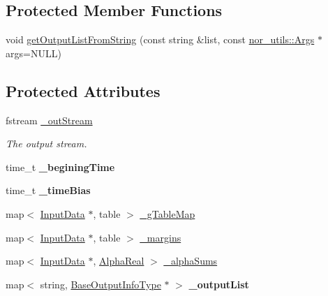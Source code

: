 \subsection*{Protected Member Functions}
\begin{DoxyCompactItemize}
\item 
void \hyperlink{classMultiBoost_1_1OutputInfo_a0c6dfc8babe3815d10888d2ec7c6ccc9}{get\-Output\-List\-From\-String} (const string \&list, const \hyperlink{classnor__utils_1_1Args}{nor\-\_\-utils\-::\-Args} $\ast$args=N\-U\-L\-L)
\end{DoxyCompactItemize}
\subsection*{Protected Attributes}
\begin{DoxyCompactItemize}
\item 
\hypertarget{classMultiBoost_1_1OutputInfo_a9218ec74c3b278be4ad81d90a93d5535}{fstream \hyperlink{classMultiBoost_1_1OutputInfo_a9218ec74c3b278be4ad81d90a93d5535}{\-\_\-out\-Stream}}\label{classMultiBoost_1_1OutputInfo_a9218ec74c3b278be4ad81d90a93d5535}

\begin{DoxyCompactList}\small\item\em The output stream. \end{DoxyCompactList}\item 
\hypertarget{classMultiBoost_1_1OutputInfo_a412abadc6b0171bf233890c00965e62a}{time\-\_\-t {\bfseries \-\_\-begining\-Time}}\label{classMultiBoost_1_1OutputInfo_a412abadc6b0171bf233890c00965e62a}

\item 
\hypertarget{classMultiBoost_1_1OutputInfo_a241d192ace61b9ae826e0e076a625980}{time\-\_\-t {\bfseries \-\_\-time\-Bias}}\label{classMultiBoost_1_1OutputInfo_a241d192ace61b9ae826e0e076a625980}

\item 
map$<$ \hyperlink{classMultiBoost_1_1InputData}{Input\-Data} $\ast$, table $>$ \hyperlink{classMultiBoost_1_1OutputInfo_a0d95c1f68bad97c49e0333bdde066940}{\-\_\-g\-Table\-Map}
\item 
map$<$ \hyperlink{classMultiBoost_1_1InputData}{Input\-Data} $\ast$, table $>$ \hyperlink{classMultiBoost_1_1OutputInfo_a350f1c9355d0602ec20c99ed70491e85}{\-\_\-margins}
\item 
map$<$ \hyperlink{classMultiBoost_1_1InputData}{Input\-Data} $\ast$, \hyperlink{Defaults_8h_a80184c4fd10ab70a1a17c5f97dcd1563}{Alpha\-Real} $>$ \hyperlink{classMultiBoost_1_1OutputInfo_ad887f8e1b0f0be528082f28e3514879b}{\-\_\-alpha\-Sums}
\item 
\hypertarget{classMultiBoost_1_1OutputInfo_ab0d7902cb985b047a13671c1cc0991a1}{map$<$ string, \hyperlink{classMultiBoost_1_1BaseOutputInfoType}{Base\-Output\-Info\-Type} $\ast$ $>$ {\bfseries \-\_\-output\-List}}\label{classMultiBoost_1_1OutputInfo_ab0d7902cb985b047a13671c1cc0991a1}


\end{DoxyCompactItemize}
